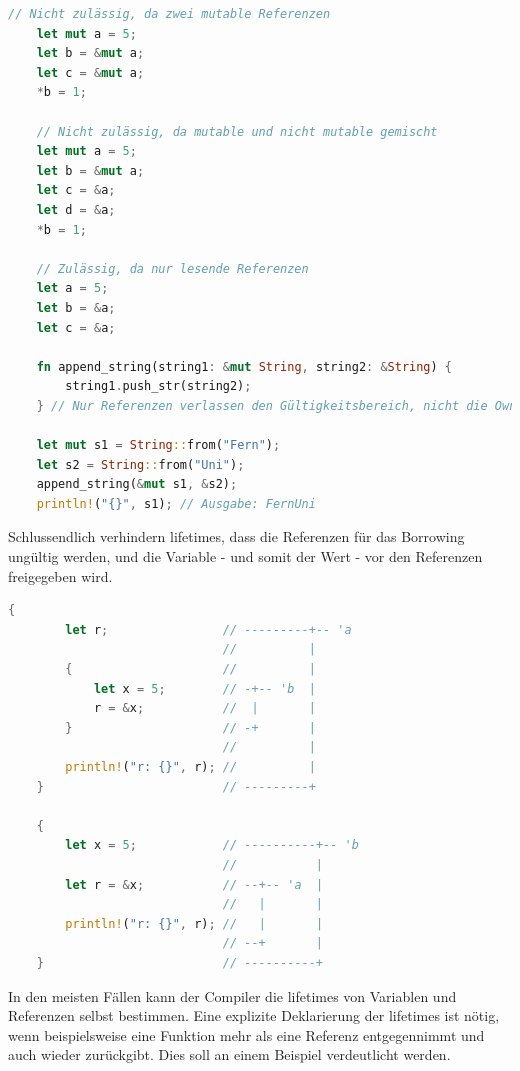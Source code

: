\documentclass[11pt,a4paper, ngerman]{article}
\begin{document}
\begin{lstlisting}[language=rust, caption={borrowing}]
    // Nicht zulässig, da zwei mutable Referenzen
    let mut a = 5;
    let b = &mut a;
    let c = &mut a;
    *b = 1;

    // Nicht zulässig, da mutable und nicht mutable gemischt
    let mut a = 5;
    let b = &mut a;
    let c = &a;
    let d = &a;
    *b = 1;

    // Zulässig, da nur lesende Referenzen
    let a = 5;
    let b = &a;
    let c = &a;

    fn append_string(string1: &mut String, string2: &String) {
        string1.push_str(string2);
    } // Nur Referenzen verlassen den Gültigkeitsbereich, nicht die Owner!

    let mut s1 = String::from("Fern");
    let s2 = String::from("Uni");
    append_string(&mut s1, &s2);
    println!("{}", s1); // Ausgabe: FernUni
\end{lstlisting}

Schlussendlich verhindern lifetimes, dass die Referenzen für das Borrowing ungültig werden, und die Variable - und somit der Wert - vor den Referenzen freigegeben wird.

\begin{lstlisting}[language=rust, caption={lifetime Veranschaulichung \cite{LifetimeEx}}]
    {
        let r;                // ---------+-- 'a
                              //          |
        {                     //          |
            let x = 5;        // -+-- 'b  |
            r = &x;           //  |       |
        }                     // -+       |
                              //          |
        println!("r: {}", r); //          |
    }                         // ---------+

    {
        let x = 5;            // ----------+-- 'b
                              //           |
        let r = &x;           // --+-- 'a  |
                              //   |       |
        println!("r: {}", r); //   |       |
                              // --+       |
    }                         // ----------+
\end{lstlisting}

In den meisten Fällen kann der Compiler die lifetimes von Variablen und Referenzen selbst bestimmen. Eine explizite Deklarierung der lifetimes ist nötig, wenn beispielsweise eine Funktion mehr als eine Referenz entgegennimmt und auch wieder zurückgibt. Dies soll an einem Beispiel verdeutlicht werden.
\end{document}

